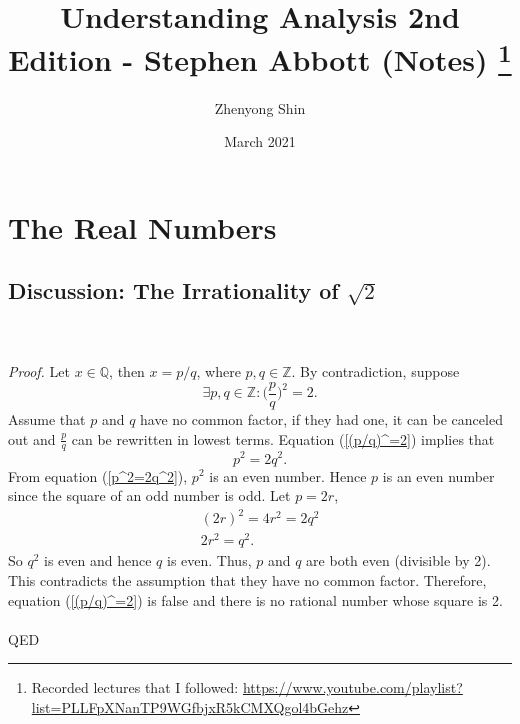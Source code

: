 \documentclass{article}
\title{Understanding Analysis 2nd Edition - Stephen Abbott (Notes) \footnote{Recorded lectures that I followed: \url{https://www.youtube.com/playlist?list=PLLFpXNanTP9WGfbjxR5kCMXQgol4bGehz}}}
\author{Zhenyong Shin}
\date{March 2021}
\begin{document}
\maketitle

\section{The Real Numbers}
\subsection{Discussion: The Irrationality of $\sqrt{2}$}
    \\ \\
    \textit{Proof.} Let $x \in \mathbb{Q}$, then $x = p/q$, where $p,q \in \mathbb{Z}$. By contradiction, suppose
    \begin{equation}
        \exists p,q \in \mathbb{Z}: \bigg( \frac{p}{q} \bigg)^2 = 2.
        \label{(p/q)^=2}
    \end{equation}
    Assume that $p$ and $q$ have no common factor, if they had one, it can be canceled out and $\frac{p}{q}$ can be rewritten in lowest terms. Equation (\ref{(p/q)^=2}) implies that
    \begin{equation}
        p^2 = 2q^2.
        \label{p^2=2q^2}
    \end{equation}
    From equation (\ref{p^2=2q^2}), $p^2$ is an even number. Hence $p$ is an even number since the square of an odd number is odd. Let $p=2r$,
    \begin{gather*}
        (2r)^2 = 4r^2 = 2q^2 \\
        2r^2 = q^2.
    \end{gather*}
    So $q^2$ is even and hence $q$ is even. Thus, $p$ and $q$ are both even (divisible by 2). This contradicts the assumption that they have no common factor. Therefore, equation (\ref{(p/q)^=2}) is false and there is no rational number whose square is 2.\\ \\ 
    QED\\
    
\end{document}
